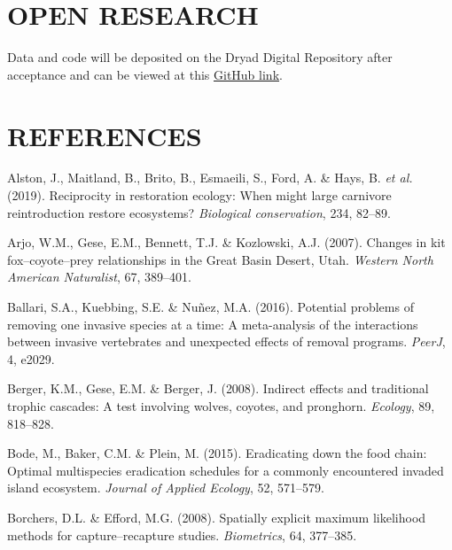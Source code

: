 \documentclass[]{elsarticle} %
\begin{document}
\hypertarget{open-research}{%
\section{OPEN RESEARCH}\label{open-research}}

Data and code will be deposited on the Dryad Digital Repository after acceptance and can be viewed at this \href{https://github.com/matt-w-rees/C2_cat_density}{GitHub link}.

\newpage

\hypertarget{references}{%
\section*{REFERENCES}\label{references}}

\hypertarget{refs}{}
\leavevmode\hypertarget{ref-alston2019}{}%
Alston, J., Maitland, B., Brito, B., Esmaeili, S., Ford, A. \& Hays, B. \emph{et al.} (2019). Reciprocity in restoration ecology: When might large carnivore reintroduction restore ecosystems? \emph{Biological conservation}, 234, 82--89.

\leavevmode\hypertarget{ref-arjo2007}{}%
Arjo, W.M., Gese, E.M., Bennett, T.J. \& Kozlowski, A.J. (2007). Changes in kit fox--coyote--prey relationships in the Great Basin Desert, Utah. \emph{Western North American Naturalist}, 67, 389--401.

\leavevmode\hypertarget{ref-ballari2016}{}%
Ballari, S.A., Kuebbing, S.E. \& Nuñez, M.A. (2016). Potential problems of removing one invasive species at a time: A meta-analysis of the interactions between invasive vertebrates and unexpected effects of removal programs. \emph{PeerJ}, 4, e2029.

\leavevmode\hypertarget{ref-berger2008indirect}{}%
Berger, K.M., Gese, E.M. \& Berger, J. (2008). Indirect effects and traditional trophic cascades: A test involving wolves, coyotes, and pronghorn. \emph{Ecology}, 89, 818--828.

\leavevmode\hypertarget{ref-bode2015}{}%
Bode, M., Baker, C.M. \& Plein, M. (2015). Eradicating down the food chain: Optimal multispecies eradication schedules for a commonly encountered invaded island ecosystem. \emph{Journal of Applied Ecology}, 52, 571--579.

\leavevmode\hypertarget{ref-borchers2008}{}%
Borchers, D.L. \& Efford, M.G. (2008). Spatially explicit maximum likelihood methods for capture--recapture studies. \emph{Biometrics}, 64, 377--385.
\end{document}

